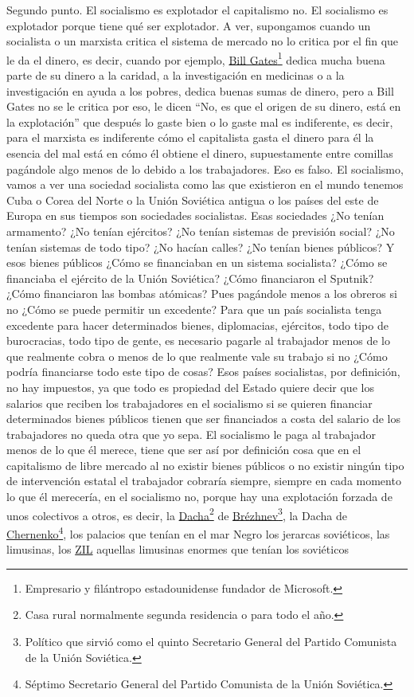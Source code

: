 Segundo punto. El socialismo es explotador el capitalismo no. El socialismo es explotador porque tiene qué ser explotador. A ver, supongamos cuando un socialista o un marxista critica el sistema de mercado no lo critica por el fin que le da el dinero, es decir, cuando por ejemplo, \href{https://en.wikipedia.org/wiki/Bill_Gates}{Bill Gates}\footnote{Empresario y filántropo estadounidense fundador de Microsoft.} dedica mucha buena parte de su dinero a la caridad, a la investigación en medicinas o a la investigación en ayuda a los pobres, dedica buenas sumas de dinero, pero a Bill Gates no se le critica por eso, le dicen \enquote{No, es que el origen de su dinero, está en la explotación} que después lo gaste bien o lo gaste mal es indiferente, es decir, para el marxista es indiferente cómo el capitalista gasta el dinero para él la esencia del mal está en cómo él obtiene el dinero, supuestamente entre comillas pagándole algo menos de lo debido a los trabajadores. Eso es falso. El socialismo, vamos a ver una sociedad socialista como las que existieron en el mundo tenemos Cuba o Corea del Norte o la Unión Soviética antigua o los países del este de Europa en sus tiempos son sociedades socialistas. Esas sociedades ¿No tenían armamento? ¿No tenían ejércitos? ¿No tenían sistemas de previsión social? ¿No tenían sistemas de todo tipo? ¿No hacían calles? ¿No tenían bienes públicos? Y esos bienes públicos ¿Cómo se financiaban en un sistema socialista? ¿Cómo se financiaba el ejército de la Unión Soviética? ¿Cómo financiaron el Sputnik? ¿Cómo financiaron las bombas atómicas? Pues pagándole menos a los obreros si no ¿Cómo se puede permitir un excedente? Para que un país socialista tenga excedente para hacer determinados bienes, diplomacias, ejércitos, todo tipo de burocracias, todo tipo de gente, es necesario pagarle al trabajador menos de lo que realmente cobra o menos de lo que realmente vale su trabajo si no ¿Cómo podría financiarse todo este tipo de cosas? Esos países socialistas, por definición, no hay impuestos, ya que todo es propiedad del Estado quiere decir que los salarios que reciben los trabajadores en el socialismo si se quieren financiar determinados bienes públicos tienen que ser financiados a costa del salario de los trabajadores no queda otra que yo sepa. El socialismo le paga al trabajador menos de lo que él merece, tiene que ser así por definición cosa que en el capitalismo de libre mercado al no existir bienes públicos o no existir ningún tipo de intervención estatal el trabajador cobraría siempre, siempre en cada momento lo que él merecería, en el socialismo no, porque hay una explotación forzada de unos colectivos a otros, es decir, la \href{https://en.wikipedia.org/wiki/Dacha}{Dacha}\footnote{Casa rural normalmente segunda residencia o para todo el año.} de \href{https://en.wikipedia.org/wiki/Leonid_Brezhnev}{Brézhnev}\footnote{Político que sirvió como el quinto Secretario General del Partido Comunista de la Unión Soviética.}, la Dacha de \href{https://en.wikipedia.org/wiki/Konstantin_Chernenko}{Chernenko}\footnote{Séptimo Secretario General del Partido Comunista de la Unión Soviética.}, los palacios que tenían en el mar Negro los jerarcas soviéticos, las limusinas, los \href{https://en.wikipedia.org/wiki/ZiL}{ZIL} aquellas limusinas enormes que tenían los soviéticos 